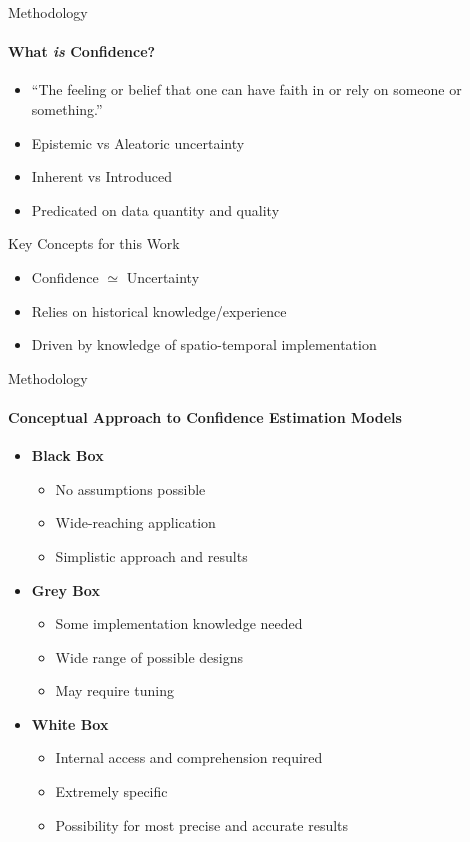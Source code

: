 \documentclass{beamer}
\begin{document}
\begin{frame}[t]{Methodology}
  \framesubtitle{What \emph{is} Confidence?}

  \begin{itemize}
    \item “The feeling or belief that one can have faith in or rely on someone or something.” \cite{Confidence2019}
    \item Epistemic vs Aleatoric uncertainty
    \item Inherent vs Introduced
    \item Predicated on data quantity and quality
  \end{itemize}

  \begin{block}{Key Concepts for this Work}
    \begin{itemize}
      \item Confidence $\simeq$ Uncertainty \cite{Geifman2018}
      \item Relies on historical knowledge/experience
      \item Driven by knowledge of spatio-temporal implementation
    \end{itemize}
  \end{block}

\end{frame}



\begin{frame}[t]{Methodology}
  \framesubtitle{Conceptual Approach to Confidence Estimation Models}
  \begin{itemize}
    \setlength\itemsep{1em}
  \item \textbf{Black Box}
      \begin{itemize}
        \item No assumptions possible
        \item Wide-reaching application
        \item Simplistic approach and results
      \end{itemize}

    \item \textbf{Grey Box}
      \begin{itemize}
        \item Some implementation knowledge needed
        \item Wide range of possible designs
        \item May require tuning
      \end{itemize}

    \item \textbf{White Box}
      \begin{itemize}
        \item Internal access and comprehension required
        \item Extremely specific
        \item Possibility for most precise and accurate results
      \end{itemize}

  \end{itemize}
\end{frame}
\end{document}
